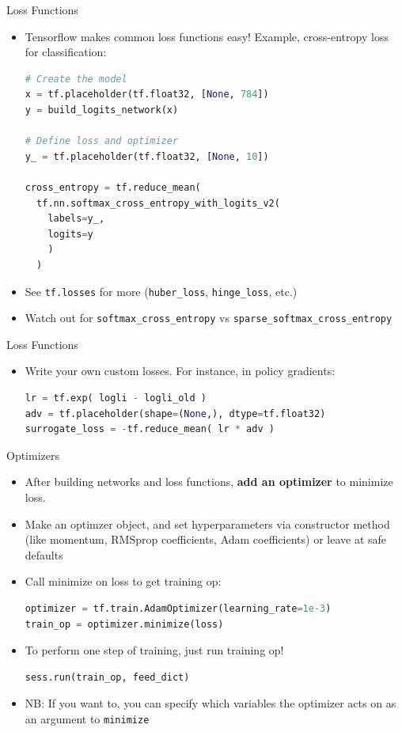\documentclass[]{beamer}
\begin{document}
\begin{frame}[fragile]{Loss Functions}

\begin{itemize}
\item Tensorflow makes common loss functions easy! Example, cross-entropy loss for classification:
\begin{lstlisting}[language=python]
# Create the model
x = tf.placeholder(tf.float32, [None, 784])
y = build_logits_network(x)

# Define loss and optimizer
y_ = tf.placeholder(tf.float32, [None, 10])

cross_entropy = tf.reduce_mean(
  tf.nn.softmax_cross_entropy_with_logits_v2(
    labels=y_, 
    logits=y
    )
  )
\end{lstlisting}
\item See \verb|tf.losses| for more (\verb|huber_loss|, \verb|hinge_loss|, etc.)
\item Watch out for \verb|softmax_cross_entropy| vs \verb|sparse_softmax_cross_entropy|
\end{itemize}
\end{frame}

\begin{frame}[fragile]{Loss Functions}
\begin{itemize}
\item Write your own custom losses. For instance, in policy gradients:
\begin{lstlisting}[language=python]
lr = tf.exp( logli - logli_old )
adv = tf.placeholder(shape=(None,), dtype=tf.float32)
surrogate_loss = -tf.reduce_mean( lr * adv )
\end{lstlisting}

\end{itemize}

\end{frame}

\begin{frame}[fragile]{Optimizers}

\begin{itemize}
\item After building networks and loss functions, \textbf{add an optimizer} to minimize loss.
\item Make an optimzer object, and set hyperparameters via constructor method (like momentum, RMSprop coefficients, Adam coefficients) or leave at safe defaults
\item Call minimize on loss to get training op:
\begin{lstlisting}[language=python]
optimizer = tf.train.AdamOptimizer(learning_rate=1e-3)
train_op = optimizer.minimize(loss)
\end{lstlisting}
\item To perform one step of training, just run training op!
\begin{lstlisting}[language=python]
sess.run(train_op, feed_dict)
\end{lstlisting}
\item NB: If you want to, you can specify which variables the optimizer acts on as an argument to \verb|minimize|
\end{itemize}

\end{frame}
\end{document}

